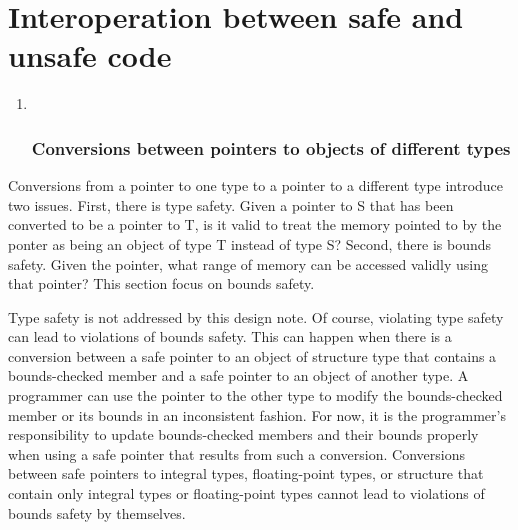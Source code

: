 
 \chapter{Interoperation between safe and unsafe code}\label{interoperation-between-safe-and-unsafe-code}

  \begin{enumerate}
  \def\labelenumii{\arabic{enumii}.}
  \item ~
    \subsection{\texorpdfstring{\protect\hypertarget{ux5fToc422906963}{}{\protect\hypertarget{ux5fToc424307687}{}{\protect\hypertarget{ux5fToc426641110}{}{\protect\hypertarget{ux5fToc435434969}{}{\protect\hypertarget{ux5fToc437460796}{}{\protect\hypertarget{ux5fRef438042394}{}{\protect\hypertarget{ux5fToc440445477}{}{\protect\hypertarget{ux5fToc440449259}{}{\protect\hypertarget{ux5fToc440551909}{}{}}}}}}}}}Conversions
    between pointers to objects of different
    types}{Conversions between pointers to objects of different types}}\label{conversions-between-pointers-to-objects-of-different-types}
  \end{enumerate}

Conversions from a pointer to one type to a pointer to a different type
introduce two issues. First, there is type safety. Given a pointer to S
that has been converted to be a pointer to T, is it valid to treat the
memory pointed to by the ponter as being an object of type T instead of
type S? Second, there is bounds safety. Given the pointer, what range of
memory can be accessed validly using that pointer? This section focus on
bounds safety.

Type safety is not addressed by this design note. Of course, violating
type safety can lead to violations of bounds safety. This can happen
when there is a conversion between a safe pointer to an object of
structure type that contains a bounds-checked member and a safe pointer
to an object of another type. A programmer can use the pointer to the
other type to modify the bounds-checked member or its bounds in an
inconsistent fashion. For now, it is the programmer's responsibility to
update bounds-checked members and their bounds properly when using a
safe pointer that results from such a conversion. Conversions between
safe pointers to integral types, floating-point types, or structure that
contain only integral types or floating-point types cannot lead to
violations of bounds safety by themselves.

